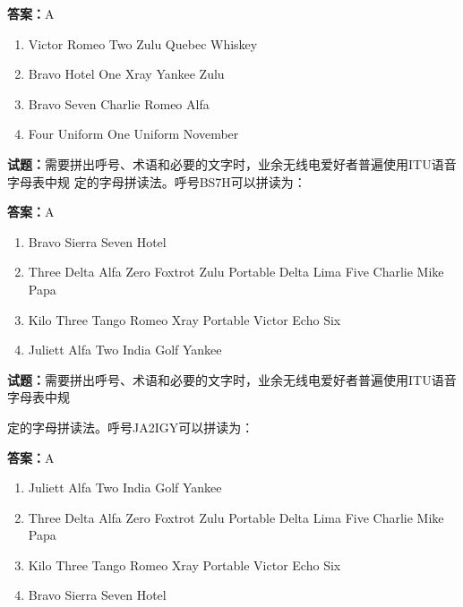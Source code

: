 \documentclass{ctexbook}
\begin{document}
\textbf{答案：}A 

\begin{enumerate}[leftmargin=3em]
  \item Victor Romeo Two Zulu Quebec Whiskey 

  \item Bravo Hotel One Xray Yankee Zulu 

  \item Bravo Seven Charlie Romeo Alfa 

  \item Four Uniform One Uniform November 

\end{enumerate}





\vspace{1em}

\textbf{试题：}需要拼出呼号、术语和必要的文字时，业余无线电爱好者普遍使用ITU语音字母表中规
定的字母拼读法。呼号BS7H可以拼读为： 

\textbf{答案：}A 

\begin{enumerate}[leftmargin=3em]
  \item Bravo Sierra Seven Hotel 

  \item Three Delta Alfa Zero Foxtrot Zulu Portable Delta Lima Five Charlie Mike Papa 

  \item Kilo Three Tango Romeo Xray Portable Victor Echo Six 

  \item Juliett Alfa Two India Golf Yankee 

\end{enumerate}





\vspace{1em}

\textbf{试题：}需要拼出呼号、术语和必要的文字时，业余无线电爱好者普遍使用ITU语音字母表中规


定的字母拼读法。呼号JA2IGY可以拼读为： 

\textbf{答案：}A 

\begin{enumerate}[leftmargin=3em]
  \item Juliett Alfa Two India Golf Yankee 

  \item Three Delta Alfa Zero Foxtrot Zulu Portable Delta Lima Five Charlie Mike Papa 

  \item Kilo Three Tango Romeo Xray Portable Victor Echo Six 

  \item Bravo Sierra Seven Hotel 

\end{enumerate}
\end{document}
